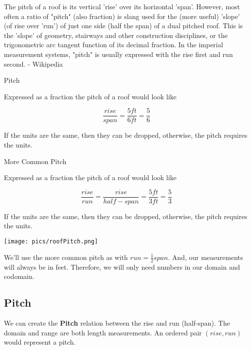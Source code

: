 \documentclass{ximera}
\author{Alan Yang}
\begin{document}
The pitch of a roof is its vertical 'rise' over its horizontal 'span'. However, most often a ratio of "pitch" (also fraction) is slang used for the (more useful) 'slope' (of rise over 'run') of just one side (half the span) of a dual pitched roof. This is the 'slope' of geometry, stairways and other construction disciplines, or the trigonometric arc tangent function of its decimal fraction. In the imperial measurement systems, "pitch" is usually expressed with the rise first and run second. - Wikipedia


\begin{example} Pitch


Expressed as a fraction the pitch of a roof would look like

\[
\frac{rise}{span} = \frac{5 ft}{6 ft} = \frac{5}{6}
\]

If the units are the same, then they can be dropped, otherwise, the pitch requires the units.
\end{example}






\begin{example} More Common Pitch


Expressed as a fraction the pitch of a roof would look like

\[
\frac{rise}{run} = \frac{rise}{half-span} = \frac{5 ft}{3 ft} = \frac{5}{3}
\]

If the units are the same, then they can be dropped, otherwise, the pitch requires the units.
\end{example}






\begin{image}
\texttt{[image: pics/roofPitch.png]}
\end{image}


We'll use the more common pitch as  with $run = \frac{1}{2} span$. And, our measurements will always be in feet.  Therefore, we will only need numbers in our domain and codomain.



\subsection{Pitch}
We can create the \textbf{Pitch} relation between the rise and run (half-span).  The domain and range are both length measurements.  An ordered pair $(rise, run)$ would represent a pitch.
\end{document}
